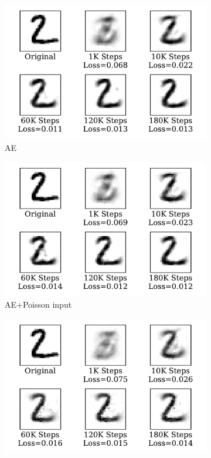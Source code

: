 \begin{figure}
	\centering
	\begin{subfigure}[t]{0.32\textwidth}
		\includegraphics[width=\textwidth]{pics_sdlm/22_MNIST_AE/recon_digit.pdf}
		\caption{AE}
	\end{subfigure}
	\begin{subfigure}[t]{0.32\textwidth}
		\includegraphics[width=\textwidth]{pics_sdlm/23_MNIST_AE_noise/recon_digit.pdf}
		\caption{AE+Poisson input}
	\end{subfigure}
	\begin{subfigure}[t]{0.32\textwidth}
		\includegraphics[width=\textwidth]{pics_sdlm/40_MNIST_SAE_original/recon_digit.pdf}

\end{subfigure}
\end{figure}
